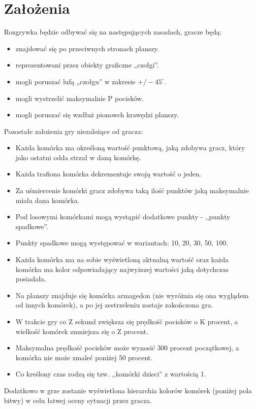 \documentclass{article}
\begin{document}
\section{Założenia}
{\fontsize{14}{14}\selectfont 


Rozgrywka będzie odbywać się na następujących zasadach, gracze będą:
\begin{itemize}

\item znajdować się po przeciwnych stronach planszy.
\item reprezentowani przez obiekty graficzne „czołgi”.
\item mogli poruszać lufą „czołgu” w zakresie $+/-45^{\circ} $.
\item mogli wystrzelić maksymalnie P pocisków.
\item mogli poruszać się wzdłuż pionowch krawędzi planszy.
\end{itemize}
\newpage
Pozostałe założenia gry niezależące od gracza:
\begin{itemize}
\item Każda komórka ma określoną wartość punktową, jaką zdobywa gracz, który jako ostatni odda strzał w daną komórkę.
\item Każda trafiona komórka dekrementuje swoją wartość o jeden.
\item Za uśmiercenie komórki gracz zdobywa taką ilość punktów jaką maksymalnie miała dana komórka.
\item Pod losowymi komórkami mogą wystąpić dodatkowe punkty - ,,punkty spadkowe''.
\item Punkty spadkowe mogą występować w wariantach: 10, 20, 30, 50, 100.
\item Każda komórka ma na sobie wyświetloną aktualną wartość oraz każda komórka ma kolor odpowiadający najwyższej wartości jaką dotychczas posiadała.
\item Na planszy znajduje się komórka armagedon (nie wyróżnia się ona wyglądem od innych komórek), a po jej zestrzeleniu zostaje zakończona gra.
\item W trakcie gry co Z sekund zwiększa się prędkość pocisków o K procent, a wielkość komórek zmniejsza się o Z procent.
\item Maksymalna prędkość pocisków może wynosić 300 procent początkowej, a komórka nie może zmaleć poniżej 50 procent.
\item Co kreślony czas rodzą się tzw. ,,komórki dzieci'' z wartością 1.
\end{itemize}

Dodatkowo w grze zostanie wyświetlona hierarchia kolorów komórek (poniżej pola bitwy) w celu łatwej oceny sytuacji przez gracza.


\newpage
}
\end{document}
